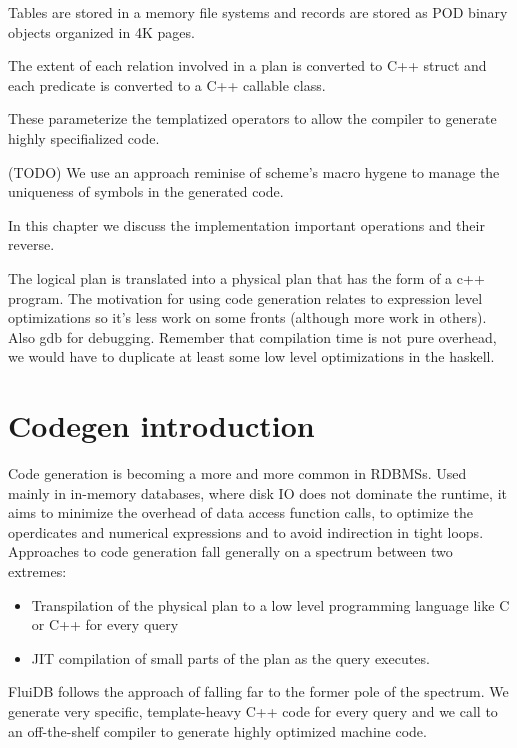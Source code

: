 
\begin{summary}
\item Tables are stored in a memory file systems and records are
  stored as POD binary objects organized in 4K pages.
\item The extent of each relation involved in a plan is converted to
  C++ struct and each predicate is converted to a C++ callable
  class.
\item These parameterize the templatized operators to allow the
  compiler to generate highly specifialized code.
\item (TODO) We use an approach reminise of scheme's macro hygene to manage
  the uniqueness of symbols in the generated code.
\item In this chapter we discuss the implementation important
  operations and their reverse.
\end{summary}

The logical plan is translated into a physical plan that has the form
of a c++ program. The motivation for using code generation relates to
expression level optimizations so it’s less work on some fronts
(although more work in others). Also gdb for debugging. Remember that
compilation time is not pure overhead, we would have to duplicate at
least some low level optimizations in the haskell.

\section{Codegen introduction}

Code generation is becoming a more and more common in RDBMSs. Used
mainly in in-memory databases, where disk IO does not dominate the
runtime, it aims to minimize the overhead of data access function
calls, to optimize the operdicates and numerical expressions and to
avoid indirection in tight loops. Approaches to code generation fall
generally on a spectrum between two extremes:

\begin{itemize}
\item Transpilation of the physical plan to a low level programming
  language like C or C++ for every query
\item JIT compilation of small parts of the plan as the query
  executes.
\end{itemize}

FluiDB follows the approach of
\cite{krikellasGeneratingCodeHolistic2010} falling far to the former
pole of the spectrum. We generate very specific, template-heavy C++
code for every query and we call to an off-the-shelf compiler to
generate highly optimized machine code.

